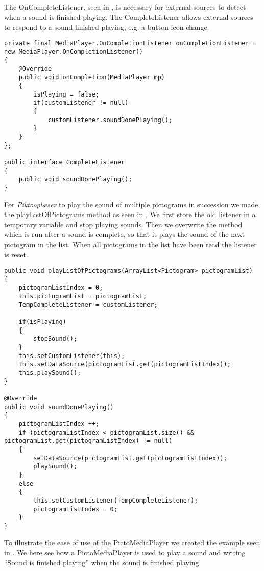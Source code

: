 The OnCompleteListener, seen in , is necessary for external sources to detect when a sound is finished playing. The CompleteListener allows external sources to respond to a sound finished playing, e.g. a button icon change.

\begin{lstlisting}[caption={onCompleteListener method of PictoMediaPlayer.}, label={lst:completelistener}]
private final MediaPlayer.OnCompletionListener onCompletionListener = new MediaPlayer.OnCompletionListener()
{
    @Override
    public void onCompletion(MediaPlayer mp) 
    {
        isPlaying = false;
        if(customListener != null)
        {
            customListener.soundDonePlaying();
        }
    }
};

public interface CompleteListener
{
    public void soundDonePlaying();
}
\end{lstlisting}

For \textit{Piktooplæser} to play the sound of multiple pictograms in succession we made the playListOfPictograms method as seen in . 
We first store the old listener in a temporary variable and stop playing sounds. Then we overwrite the method which is run after a sound is complete, so that it plays the sound of the next pictogram in the list. When all pictograms in the list have been read the listener is reset. %

\begin{lstlisting}[caption={playListOfPictograms method of PictoMediaPlayer.}, label={lst:playlist}]
public void playListOfPictograms(ArrayList<Pictogram> pictogramList)
{
    pictogramListIndex = 0;
    this.pictogramList = pictogramList;
    TempCompleteListener = customListener;

    if(isPlaying)
    {
        stopSound();
    }
    this.setCustomListener(this);
    this.setDataSource(pictogramList.get(pictogramListIndex));
    this.playSound();
}

@Override
public void soundDonePlaying()
{
    pictogramListIndex ++;
    if (pictogramListIndex < pictogramList.size() && pictogramList.get(pictogramListIndex) != null)
    {
        setDataSource(pictogramList.get(pictogramListIndex));
        playSound();
    }
    else
    {
        this.setCustomListener(TempCompleteListener);
        pictogramListIndex = 0;
    }
}
\end{lstlisting}

To illustrate the ease of use of the PictoMediaPlayer we created the example seen in . 
We here see how a PictoMediaPlayer is used to play a sound and writing ``Sound is finished playing'' when the sound is finished playing.

